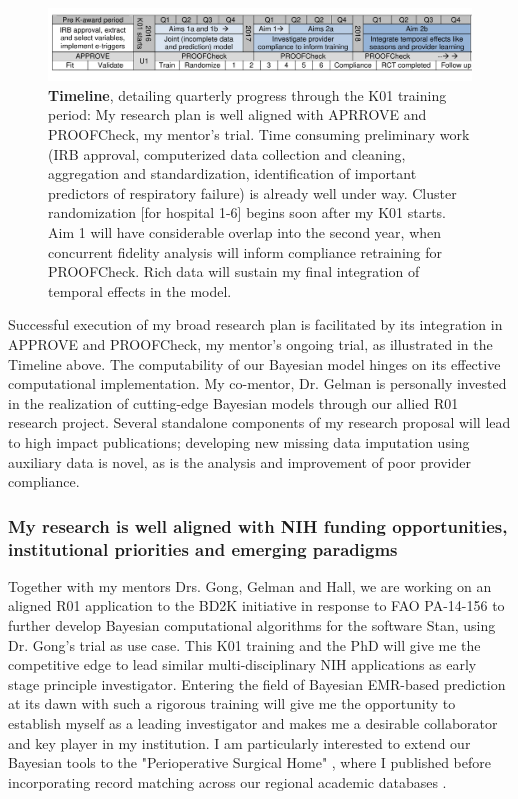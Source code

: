 \documentclass[11pt,notitlepage]{article}
\begin{document}
\begin{figure}[h]
 \vspace{-20pt}
 \centering
   \includegraphics[scale=1]{Figures/Timeline.pdf}  
 \vspace{-30pt}
 \caption*{\footnotesize \textbf{Timeline}, detailing quarterly progress through the K01 training period: My research plan is well aligned with APRROVE and PROOFCheck, my mentor's trial. Time consuming preliminary work (IRB approval, computerized data collection and cleaning, aggregation and standardization, identification of important predictors of respiratory failure) is already well under way. Cluster randomization [for hospital 1-6] begins soon after my K01 starts. Aim 1 will have considerable overlap into the second year, when concurrent fidelity analysis will inform compliance retraining for PROOFCheck. Rich data will sustain my final integration of temporal effects in the model.}
  \vspace{-10pt}
  \label{fig:Timeline}
 \end{figure}
 
Successful execution of my broad research plan is facilitated by its integration in APPROVE and PROOFCheck, my mentor's ongoing trial, as illustrated in the Timeline above. The computability of our Bayesian model hinges on its effective computational implementation. My co-mentor, Dr. Gelman is personally invested in the realization of cutting-edge Bayesian models through our allied R01 research project. Several standalone components of my research proposal will lead to high impact publications; developing new missing data imputation using auxiliary data is novel, as is the analysis and improvement of poor provider compliance. 

\subsubsection*{My research is well aligned with NIH funding opportunities, institutional priorities and emerging paradigms}
Together with my mentors Drs. Gong, Gelman and Hall, we are working on an aligned R01 application to the BD2K initiative in response to FAO PA-14-156 to further develop Bayesian computational algorithms for the software Stan, using Dr. Gong's trial as use case. This K01 training and the PhD will give me the competitive edge to lead similar multi-disciplinary NIH applications as early stage principle investigator. Entering the field of Bayesian EMR-based prediction at its dawn with such a rigorous training will give me the opportunity to establish myself as a leading investigator and makes me a desirable collaborator and key player in my institution. I am particularly interested to extend our Bayesian tools to  the "Perioperative Surgical Home" \cite{Vetter_24781579}, where I published before \cite{Andreae_23811426} incorporating record matching across our regional academic databases \cite{Kaushal_24821739}.
\end{document}
